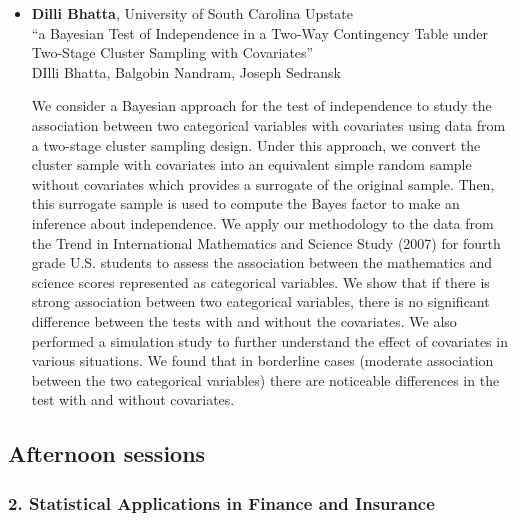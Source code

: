 \begin{itemize}
\item \textbf{Dilli Bhatta}, University of South Carolina Upstate \\
``a Bayesian Test of Independence in a Two-Way  Contingency Table  under Two-Stage Cluster Sampling with Covariates'' \\
DIlli Bhatta, Balgobin Nandram, Joseph Sedransk


We consider a Bayesian approach for the test of independence to study the association between two categorical variables with covariates using data from a two-stage cluster sampling design. Under this approach, we convert the cluster sample with covariates into an equivalent simple random sample without covariates which provides a surrogate of the original sample. Then, this surrogate sample is used to compute the Bayes factor to make an inference about independence.
We apply our methodology to the data from the Trend in International Mathematics and Science Study (2007) for fourth grade U.S. students to assess the association between the mathematics and science scores represented as categorical variables. 
We show that if there is strong association between two categorical variables, there is no significant difference between the tests with and without the covariates. We also performed a simulation study to further understand the effect of covariates in various situations. We found that in borderline cases (moderate association between the two categorical variables) there are noticeable differences in the test with and without covariates. 

\end{itemize}

\subsection*{Afternoon sessions}

\subsubsection*{2. Statistical Applications in Finance and Insurance}

